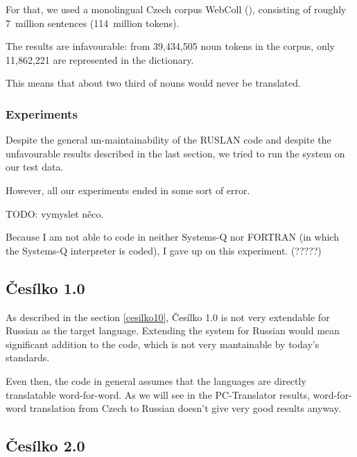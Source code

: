 For that, we used a monolingual Czech corpus WebColl (\cite{webcoll}), consisting of roughly 7~million sentences (114~million tokens).


The results are infavourable: from 39,434,505 noun tokens in the corpus, only 11,862,221 are represented in the dictionary.

This means that about two third of nouns would never be translated.

\subsubsection{Experiments}

Despite the general un-maintainability of the RUSLAN code and despite the unfavourable results described in the last section, we tried to run the system on our test data.

However, all our experiments ended in some sort of error.

TODO: vymyslet něco.

Because I am not able to code in neither Systems-Q nor FORTRAN (in which the Systems-Q interpreter is coded), I gave up on this experiment. (?????)

\subsection{Česílko 1.0}


As described in the section \ref{cesilko10}, Česílko 1.0 is not very extendable for Russian as the target language. Extending the system for Russian would mean significant addition to the code, which is not very mantainable by today's standards. 

Even then, the code in general assumes that the languages are directly translatable word-for-word. As we will see in the PC-Translator results, word-for-word translation from Czech to Russian doesn't give very good results anyway.

\subsection{Česílko 2.0}

